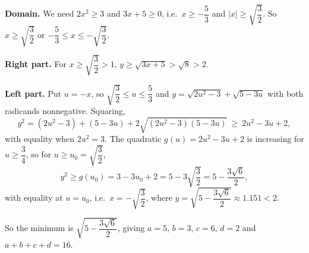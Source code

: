 \textbf{Domain.} We need $2x^2\ge3$ and $3x+5\ge0$, i.e.\ $x\ge-\dfrac{5}{3}$ and $|x|\ge\sqrt{\dfrac{3}{2}}$. So $x\ge\sqrt{\dfrac{3}{2}}$ or $-\dfrac{5}{3}\le x\le-\sqrt{\dfrac{3}{2}}$.

\textbf{Right part.} For $x\ge\sqrt{\dfrac{3}{2}}>1$, $y\ge\sqrt{3x+5}>\sqrt8>2$.

\textbf{Left part.} Put $u=-x$, so $\sqrt{\dfrac{3}{2}}\le u\le\dfrac{5}{3}$ and $y=\sqrt{2u^2-3}+\sqrt{5-3u}$ with both radicands nonnegative. Squaring,
\[
y^2=(2u^2-3)+(5-3u)+2\sqrt{(2u^2-3)(5-3u)}\ \ge\ 2u^2-3u+2 ,
\]
with equality when $2u^2=3$. The quadratic $g(u)=2u^2-3u+2$ is increasing for $u\ge\dfrac{3}{4}$, so for $u\ge u_0=\sqrt{\dfrac{3}{2}}$,
\[
y^2\ge g(u_0)=3-3u_0+2=5-3\sqrt{\dfrac{3}{2}}=5-\dfrac{3\sqrt6}{2},
\]
with equality at $u=u_0$, i.e.\ $x=-\sqrt{\dfrac{3}{2}}$, where $y=\sqrt{5-\dfrac{3\sqrt6}{2}}\approx1.151<2$.

So the minimum is $\sqrt{5-\dfrac{3\sqrt6}{2}}$, giving $a=5$, $b=3$, $c=6$, $d=2$ and $a+b+c+d=\boxed{16}$.
